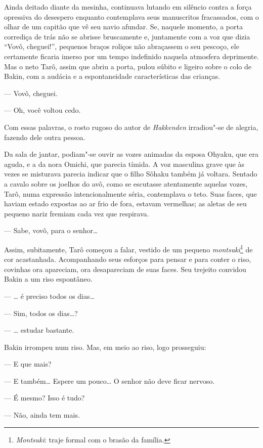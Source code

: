 Ainda deitado diante da mesinha, continuava lutando em silêncio contra a
força opressiva do desespero enquanto contemplava seus manuscritos
fracassados, com o olhar de um capitão que vê seu navio afundar. Se,
naquele momento, a porta corrediça de trás não se abrisse bruscamente
e, juntamente com a voz que dizia ``Vovô, cheguei!'', pequenos braços
roliços não abraçassem o seu pescoço, ele certamente ficaria imerso por
um tempo indefinido naquela atmosfera deprimente. Mas o neto Tarô,
assim que abriu a porta, pulou súbito e ligeiro sobre o colo de Bakin,
com a audácia e a espontaneidade características das crianças.

--- Vovô, cheguei.

--- Oh, você voltou cedo.

Com essas palavras, o rosto rugoso do autor de \textit{Hakkenden}
irradiou"-se de alegria, fazendo dele outra pessoa.

\sectionitem
Da sala de jantar, podiam"-se ouvir as vozes animadas da esposa Ohyaku, que
era aguda, e a da nora Omichi, que parecia tímida. A voz masculina
grave que às vezes se misturava parecia indicar que o filho Sôhaku
também já voltara. Sentado a cavalo sobre os joelhos do avô, como se
escutasse atentamente aquelas vozes, Tarô, numa expressão
intencionalmente séria, contemplava o teto. Suas faces, que haviam
estado expostas ao ar frio de fora, estavam vermelhas; as aletas de seu
pequeno nariz fremiam cada vez que respirava.

--- Sabe, vovô, para o senhor\ldots{}

Assim, subitamente, Tarô começou a falar, vestido de um pequeno
\textit{montsuki}\footnote{ \textit{Montsuki}: traje formal
com o brasão da família.} de cor acastanhada. Acompanhando seus
esforços para pensar e para conter o riso, covinhas ora apareciam, ora
desapareciam de suas faces. Seu trejeito convidou Bakin a um riso
espontâneo.

--- \ldots{} é preciso todos os dias\ldots{}

--- Sim, todos os dias\ldots{}?

--- \ldots{} estudar bastante.

Bakin irrompeu num riso. Mas, em meio ao riso, logo prosseguiu:

--- E que mais?

--- E também\ldots{} Espere um pouco\ldots{} O senhor não deve ficar nervoso.

--- É mesmo? Isso é tudo?

--- Não, ainda tem mais.

